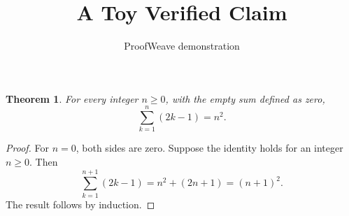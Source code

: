 \documentclass{article}
\title{A Toy Verified Claim}
\author{ProofWeave demonstration}
\newtheorem{theorem}{Theorem}
\begin{document}
\maketitle
\begin{theorem}\label{thm:odd-sum}
For every integer $n\geq 0$, with the empty sum defined as zero,
\[
  \sum_{k=1}^{n}(2k-1)=n^2.
\]
\end{theorem}
\begin{proof}
For $n=0$, both sides are zero. Suppose the identity holds for an integer
$n\geq0$. Then
\[
 \sum_{k=1}^{n+1}(2k-1)=n^2+(2n+1)=(n+1)^2.
\]
The result follows by induction.
\end{proof}
\end{document}
